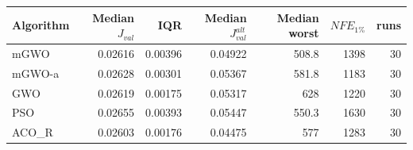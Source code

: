 \begin{tabular}{lrrrrrr}
\hline
Algorithm & Median $J_{val}$ & IQR & Median $J_{val}^{alt}$ & Median worst & $NFE_{1\%}$ & runs \\
\hline
mGWO & 0.02616 & 0.00396 & 0.04922 & 508.8 & 1398 & 30 \\
mGWO-a & 0.02628 & 0.00301 & 0.05367 & 581.8 & 1183 & 30 \\
GWO & 0.02619 & 0.00175 & 0.05317 & 628 & 1220 & 30 \\
PSO & 0.02655 & 0.00393 & 0.05447 & 550.3 & 1630 & 30 \\
ACO\_R & 0.02603 & 0.00176 & 0.04475 & 577 & 1283 & 30 \\
\hline
\end{tabular}
